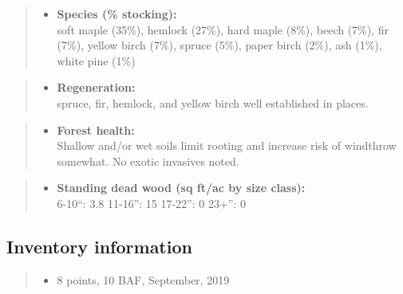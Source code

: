\documentclass[]{tufte-handout}
\providecommand{\tightlist}{%
  \setlength{\itemsep}{0pt}\setlength{\parskip}{0pt}}
\begin{document}
\begin{quote}
\begin{itemize}
\tightlist
\item
  \textbf{Species (\% stocking):}\\
  \vspace{2pt} soft maple (35\%), hemlock (27\%), hard maple (8\%),
  beech (7\%), fir (7\%), yellow birch (7\%), spruce (5\%), paper birch
  (2\%), ash (1\%), white pine (1\%)
\end{itemize}
\end{quote}

\begin{quote}
\begin{itemize}
\tightlist
\item
  \textbf{Regeneration:}\\
  \vspace{2pt} spruce, fir, hemlock, and yellow birch well established
  in places.
\end{itemize}
\end{quote}

\begin{quote}
\begin{itemize}
\tightlist
\item
  \textbf{Forest health:}\\
  \vspace{2pt} Shallow and/or wet soils limit rooting and increase risk
  of windthrow somewhat. No exotic invasives noted.
\end{itemize}
\end{quote}

\begin{quote}
\begin{itemize}
\tightlist
\item
  \textbf{Standing dead wood (sq ft/ac by size class):}\\
  \vspace{2pt} \indent \small 6-10``: 3.8 \textbar{} 11-16'': 15
  \textbar{} 17-22'': 0 \textbar{} 23+'': 0
\end{itemize}
\end{quote}

\subsection{Inventory information}\label{inventory-information-6}

\begin{quote}
\begin{itemize}
\tightlist
\item
  8 points, 10 BAF, September, 2019
\end{itemize}
\end{quote}
\end{document}

